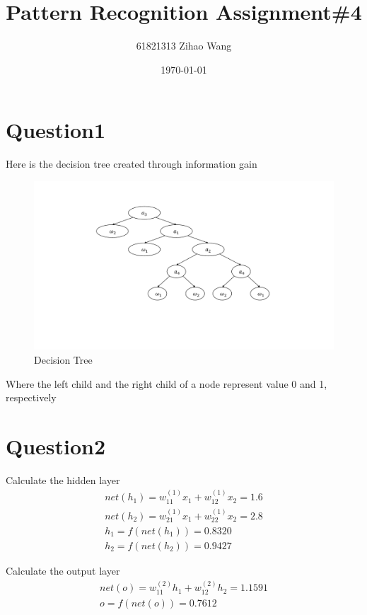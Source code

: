 \documentclass{article}
\title{Pattern Recognition Assignment\#4}
\author{61821313 Zihao Wang}
\date{\today}
\begin{document}
\maketitle

\section*{Question1}

Here is the decision tree created through information gain

\begin{figure}[htbp]
    \centering
    \includegraphics[width=\textwidth, trim=80 150 30 80, clip]{tree.pdf}
    \caption{Decision Tree}
\end{figure}

Where the left child and the right child of a node represent value 0 and 1, respectively

\section*{Question2}

Calculate the hidden layer
\begin{gather*}
net(h_{1}) = w_{11}^{(1)} x_{1} + w_{12}^{(1)} x_{2} = 1.6 \\[3mm]
net(h_{2}) = w_{21}^{(1)} x_{1} + w_{22}^{(1)} x_{2} = 2.8 \\[3mm]
h_{1} = f(net(h_{1})) = 0.8320 \\[3mm]
h_{2} = f(net(h_{2})) = 0.9427
\end{gather*}

Calculate the output layer
\begin{gather*}
net(o) = w_{11}^{(2)} h_{1} + w_{12}^{(2)} h_{2} = 1.1591 \\[3mm]
o = f(net(o)) = 0.7612
\end{gather*}
\end{document}
